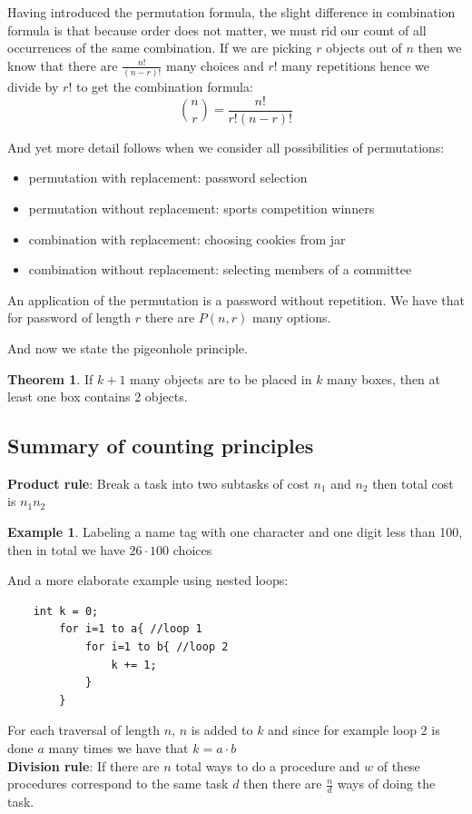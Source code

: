 \documentclass[titlepage]{article}
\theoremstyle{definition}
\newtheorem{theorem}{Theorem}[section]
\newtheorem{example}{Example}
\numberwithin{equation}{subsection}
\numberwithin{remark}{subsection}
\begin{document}
Having introduced the permutation formula, the slight difference in combination formula is that because order does not matter, we must rid our count of all occurrences of the same combination. If we are picking $r$ objects out of $n$ then we know that there are $\frac{n!}{(n-r)!}$ many choices and $r!$ many repetitions hence we divide by $r!$ to get the combination formula: $$\binom{n}{r} = \frac{n!}{r!(n-r)!} $$

And yet more detail follows when we consider all possibilities of permutations:
\begin{itemize}
    \item permutation with replacement: password selection
    \item permutation without replacement: sports competition winners
    \item combination with replacement: choosing cookies from jar
    \item combination without replacement: selecting members of a committee 
\end{itemize}

An application of the permutation is a password without repetition. We have that for password of length $r$ there are $P(n,r)$ many options. 

And now we state the pigeonhole principle.

\begin{theorem}
If $k+1$ many objects are to be placed in $k$ many boxes, then at least one box contains 2 objects.
\end{theorem}

\subsection{Summary of counting principles}

\begin{tcolorbox}[drop shadow, title=(Counting principles),lower separated=true]

\textbf{Product rule}: Break a task into two subtasks of cost $n_{1}$ and $n_{2}$ then total cost is $n_{1}n_{2}$
\begin{example}
Labeling a name tag with one character and one digit less than 100, then in total we have $26\cdot100$ choices
\end{example}

And a more elaborate example using nested loops:
\begin{lstlisting}
    int k = 0;
        for i=1 to a{ //loop 1
            for i=1 to b{ //loop 2
                k += 1;
            }
        }
\end{lstlisting}
For each traversal of length $n$, $n$ is added to $k$ and since for example loop 2 is done $a$ many times we have that $k = a\cdot b$
\\

\textbf{Division rule}: If there are $n$ total ways to do a procedure and $w$ of these procedures correspond to the same task $d$ then there are $\frac{n}{d}$ ways of doing the task. 
 
\end{tcolorbox}
\end{document}
